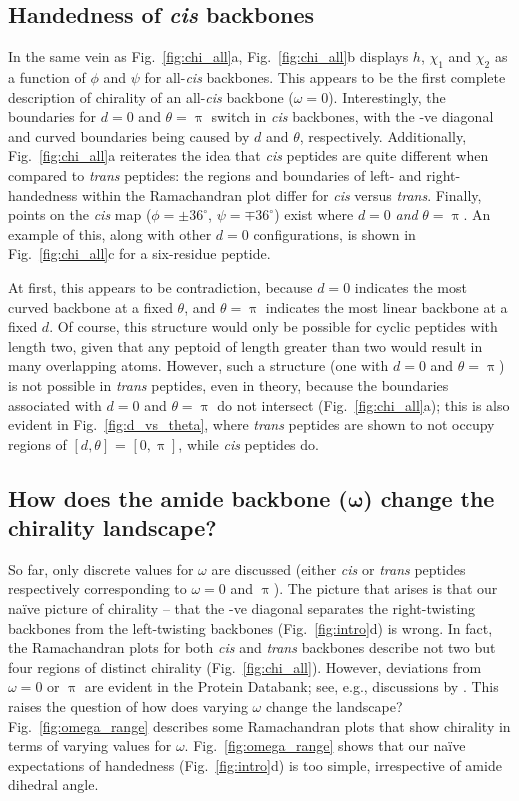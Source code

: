 \documentclass[fleqn,10pt,lineno]{wlpeerj} %
\newcommand{\n}[1]{{\color{black}#1}} %
\newcommand{\Fig}[1]{Fig.~\ref{#1}}
\newcommand{\h}{h}
\newcommand{\cis}{{\em cis}\xspace}
\newcommand{\trans}{{\em trans}\xspace}
\begin{document}
\subsection*{Handedness \n{of} \textit{cis} backbones}
In the same vein as \Fig{fig:chi_all}a, \Fig{fig:chi_all}b displays $\h$, $\chi_1$ and $\chi_2$ as a function of $\phi$ and $\psi$ for all-\cis backbones. This appears to be the first complete description of chirality of an all-\cis backbone ($\omega=0$). Interestingly, the boundaries for $d=0$ and $\theta=\uppi$ switch in \cis backbones, with the -ve diagonal and curved boundaries being caused by $d$ and $\theta$, respectively. Additionally, \Fig{fig:chi_all}a reiterates the idea that \cis peptides are quite different when compared to \trans peptides: the regions and boundaries of left- and right-handedness within the Ramachandran plot differ for \cis versus \trans. Finally, points on the \cis map ($\phi=\pm36^\circ$, $\psi=\mp36^\circ$) exist where $d=0$ {\em and} $\theta=\uppi$. \n{An example of this, along with other $d=0$ configurations, is shown in \Fig{fig:chi_all}c for a six-residue peptide.}

At first, this appears to be contradiction, because $d=0$ indicates the most curved backbone at a fixed $\theta$, and $\theta=\uppi$ indicates the most linear backbone at a fixed $d$. \n{Of course, this structure would only be possible for cyclic peptides with length two, given that any peptoid of length greater than two would result in many overlapping atoms}. However, such a structure (one with $d=0$ and $\theta=\uppi$) is not possible in \trans peptides, even in theory, because the boundaries associated with $d=0$ and $\theta=\uppi$ \n{do not} intersect (\Fig{fig:chi_all}a); this is also evident in \Fig{fig:d_vs_theta}, where \trans peptides are shown to not occupy regions of $[d,\theta]$ = $[0,\uppi]$, while \cis peptides do.

\subsection*{\n{How does the amide backbone ($\bm\omega$) change the chirality landscape?}}
\n{So far, only discrete values for $\omega$ are discussed (either \cis or \trans peptides respectively corresponding to $\omega=0$ and $\uppi$).  The picture that arises is that our na{\"i}ve picture of chirality -- that the -ve diagonal separates the right-twisting backbones from the left-twisting backbones (\Fig{fig:intro}d) is wrong. In fact, the Ramachandran plots for both \cis and \trans backbones describe not two but four regions of distinct chirality (\Fig{fig:chi_all}). However, deviations from $\omega = 0$ or $\uppi$ are evident in the Protein Databank; see, e.g., discussions by \cite{Improta2011}. This raises the question of how does varying $\omega$ change the landscape? \Fig{fig:omega_range} describes some Ramachandran plots that show chirality in terms of varying values for $\omega$. \Fig{fig:omega_range} shows that our na{\"i}ve expectations of handedness (\Fig{fig:intro}d) is too simple, irrespective of amide dihedral angle.}
\end{document}
